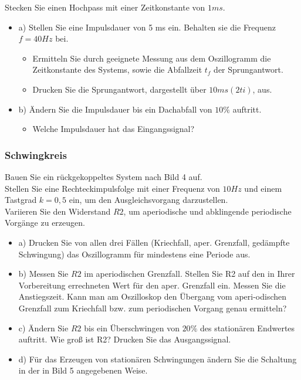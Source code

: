 Stecken Sie einen Hochpass mit einer Zeitkonstante von $1 ms$.\\
\begin{itemize}
	\item a) Stellen Sie eine Impulsdauer von 5 ms ein. Behalten sie die Frequenz $f =40 Hz$ bei.
\begin{itemize}
\item Ermitteln Sie durch geeignete Messung aus dem Oszillogramm die Zeitkonstante des Systems, sowie die Abfallzeit $t_{f}$ der Sprungantwort. 
\item Drucken Sie die Sprungantwort, dargestellt über $10 ms (2ti)$, aus. 
\end{itemize}
\end{itemize}
\begin{itemize}
	\item b) Ändern Sie die Impulsdauer bis ein Dachabfall von $10\%$ auftritt.\\
\begin{itemize}
	\item Welche Impulsdauer hat das Eingangssignal?	
\end{itemize}
\end{itemize}

\subsubsection{Schwingkreis}

Bauen Sie ein rückgekoppeltes System nach Bild 4 auf.\\
Stellen Sie eine Rechteckimpulsfolge mit einer Frequenz von $10 Hz$ und einem Tastgrad $k = 0,5$ ein, um den Ausgleichsvorgang darzustellen.\\ 
Variieren Sie den Widerstand $R2$, um aperiodische und abklingende periodische Vorgänge zu erzeugen.\\
\begin{itemize}
\item 	a) Drucken Sie von allen drei Fällen (Kriechfall, aper. Grenzfall, gedämpfte Schwingung) das Oszillogramm für mindestens eine Periode aus. 
\newline
\item	b) Messen Sie $R2$ im aperiodischen Grenzfall. Stellen Sie R2 auf den in Ihrer Vorbereitung errechneten Wert für den aper. Grenzfall ein.
Messen Sie die Anstiegszeit. Kann man am Oszilloskop den Übergang vom aperi-odischen Grenzfall zum Kriechfall bzw. zum periodischen 
Vorgang genau ermitteln? 
\newline
\item 	c) Ändern Sie $R2$ bis ein Überschwingen von $20\%$ des stationären Endwertes auftritt. 
Wie groß ist R2? Drucken Sie das Ausgangssignal. 
\newline
\item	d) Für das Erzeugen von stationären Schwingungen ändern Sie die Schaltung in der in Bild 5 angegebenen Weise. 
\newline
\end{itemize}

